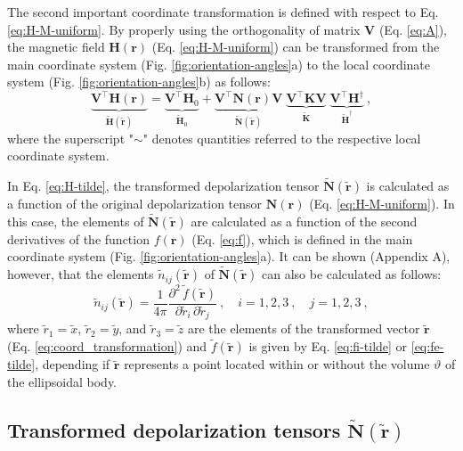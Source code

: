 \documentclass[gmd, manuscript]{copernicus}
\begin{document}
The second important coordinate transformation is defined
with respect to Eq. \ref{eq:H-M-uniform}.
By properly using the orthogonality of matrix $\mathbf{V}$
(Eq. \ref{eq:A}),
the magnetic field $\mathbf{H}(\mathbf{r})$
(Eq. \ref{eq:H-M-uniform}) can be transformed
from the main coordinate system (Fig. \ref{fig:orientation-angles}a)
to the local coordinate system (Fig. \ref{fig:orientation-angles}b) as follows:
\begin{equation}
\underbrace{\mathbf{V}^{\top} \mathbf{H}(\mathbf{r})}_{\tilde{\mathbf{H}}(\tilde{\mathbf{r}})} =
\underbrace{\mathbf{V}^{\top} \mathbf{H}_{0}}_{\tilde{\mathbf{H}}_{0}}
+ \underbrace{\mathbf{V}^{\top} \mathbf{N}(\mathbf{r}) \mathbf{V}}
_{\tilde{\mathbf{N}}(\tilde{\mathbf{r}})} \;
\underbrace{\mathbf{V}^{\top} \mathbf{K} \mathbf{V}}
_{\tilde{\mathbf{K}}} \;
\underbrace{\mathbf{V}^{\top} \mathbf{H}^{\dagger}}
_{\tilde{\mathbf{H}}^{\dagger}} \: ,
\label{eq:H-tilde}
\end{equation}
where the superscript "$\sim$" denotes quantities
referred to the respective local coordinate system.

In Eq. \ref{eq:H-tilde}, the transformed
depolarization tensor $\tilde{\mathbf{N}}(\tilde{\mathbf{r}})$
is calculated as a function of the original depolarization
tensor $\mathbf{N}(\mathbf{r})$ (Eq. \ref{eq:H-M-uniform}).
In this case, the elements of $\tilde{\mathbf{N}}(\tilde{\mathbf{r}})$
are calculated as a function of the second derivatives of the
function $f(\mathbf{r})$ (Eq. \ref{eq:f}),
which is defined in the main coordinate system (Fig. \ref{fig:orientation-angles}a).
It can be shown (Appendix A), however, that the
elements $\tilde{n}_{ij}(\tilde{\mathbf{r}})$ of
$\tilde{\mathbf{N}}(\tilde{\mathbf{r}})$ can also be calculated
as follows:
\begin{equation}
\tilde{n}_{ij}(\tilde{\mathbf{r}}) =
\frac{1}{4\pi} \frac{\partial^{2} \, \tilde{f}(\tilde{\mathbf{r}})}{\partial \tilde{r}_{i} \, \partial \tilde{r}_{j}}
\: , \quad i = 1, 2, 3 \: , \quad j = 1, 2, 3 \: ,
\label{eq:nij-tilde}
\end{equation}
where $\tilde{r}_{1} = \tilde{x}$, $\tilde{r}_{2} = \tilde{y}$,
and $\tilde{r}_{3} = \tilde{z}$ are the elements of the
transformed vector $\tilde{\mathbf{r}}$ (Eq. \ref{eq:coord_transformation})
and $\tilde{f}(\tilde{\mathbf{r}})$ is given by Eq. \ref{eq:fi-tilde}
or \ref{eq:fe-tilde}, depending if $\tilde{\mathbf{r}}$ represents a
point located within or without the volume $\vartheta$ of the
ellipsoidal body.


\subsection{Transformed depolarization tensors $\tilde{\mathbf{N}}(\tilde{\mathbf{r}})$}
\end{document}
